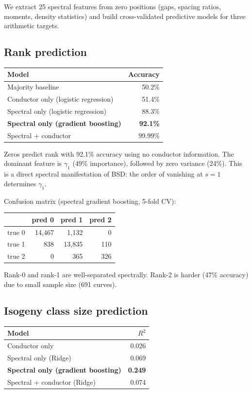 \documentclass[11pt,a4paper]{article}
\begin{document}
We extract 25 spectral features from zero positions (gaps, spacing ratios, moments, density statistics) and build cross-validated predictive models for three arithmetic targets.

\subsection{Rank prediction}

\begin{center}
\begin{tabular}{lr}
\toprule
\textbf{Model} & \textbf{Accuracy} \\
\midrule
Majority baseline & 50.2\% \\
Conductor only (logistic regression) & 51.4\% \\
Spectral only (logistic regression) & 88.3\% \\
\textbf{Spectral only (gradient boosting)} & \textbf{92.1\%} \\
Spectral + conductor & 99.99\% \\
\bottomrule
\end{tabular}
\end{center}

Zeros predict rank with 92.1\% accuracy using no conductor information. The dominant feature is $\gamma_1$ (49\% importance), followed by zero variance (24\%). This is a direct spectral manifestation of BSD: the order of vanishing at $s = 1$ determines $\gamma_1$.

Confusion matrix (spectral gradient boosting, 5-fold CV):
\begin{center}
\begin{tabular}{r|rrr}
 & pred 0 & pred 1 & pred 2 \\
\hline
true 0 & 14,467 & 1,132 & 0 \\
true 1 & 838 & 13,835 & 110 \\
true 2 & 0 & 365 & 326 \\
\end{tabular}
\end{center}

Rank-0 and rank-1 are well-separated spectrally. Rank-2 is harder (47\% accuracy) due to small sample size (691 curves).

\subsection{Isogeny class size prediction}

\begin{center}
\begin{tabular}{lr}
\toprule
\textbf{Model} & \textbf{$R^2$} \\
\midrule
Conductor only & 0.026 \\
Spectral only (Ridge) & 0.069 \\
\textbf{Spectral only (gradient boosting)} & \textbf{0.249} \\
Spectral + conductor (Ridge) & 0.074 \\
\bottomrule
\end{tabular}
\end{center}
\end{document}
